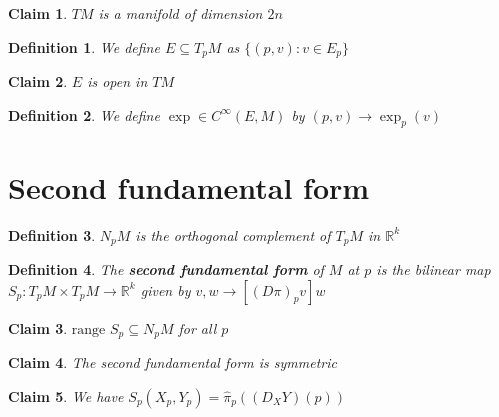 \documentclass{article}
\newtheorem{definition}{Definition}
\newtheorem{claim}{Claim}
\begin{document}
\begin{claim}
    $TM$ is a manifold of dimension $2n$
\end{claim}

\begin{definition}
    We define $E \subseteq T_pM$ as $\{(p,v): v \in E_p\}$
\end{definition}

\begin{claim}
    $E$ is open in $TM$
\end{claim}

\begin{definition}
    We define $\exp \in C^\infty(E,M)$ by $(p,v) \to \exp_p(v)$
\end{definition}

\section{Second fundamental form}

\begin{definition}
    $N_pM$ is the orthogonal complement of $T_pM$ in $\mathbb{R}^k$
\end{definition}

\begin{definition}
    The \textbf{second fundamental form} of $M$ at $p$ is the bilinear map $S_p: T_pM \times T_pM \to \mathbb{R}^k$ given by $v,w \to [(D\pi)_pv]w$
\end{definition}

\begin{claim}
    $\text{range }S_p \subseteq N_pM$ for all $p$
\end{claim}

\begin{claim}
    The second fundamental form is symmetric
\end{claim}

\begin{claim}
    We have $S_p(X_p,Y_p)=\hat{\pi}_p((D_XY)(p))$
\end{claim}
\end{document}
